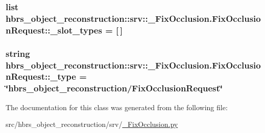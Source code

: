 \hypertarget{classhbrs__object__reconstruction_1_1srv_1_1___fix_occlusion_1_1_fix_occlusion_request_a206df69095ca36bbbbeb723b5e725949}{
\subsubsection[{\-\_\-slot\-\_\-types}]{\setlength{\rightskip}{0pt plus 5cm}list {\bf hbrs\-\_\-object\-\_\-reconstruction\-::srv\-::\-\_\-\-Fix\-Occlusion.\-Fix\-Occlusion\-Request\-::\-\_\-slot\-\_\-types} = \mbox{[}$\,$\mbox{]}}}\label{classhbrs__object__reconstruction_1_1srv_1_1___fix_occlusion_1_1_fix_occlusion_request_a206df69095ca36bbbbeb723b5e725949}
\hypertarget{classhbrs__object__reconstruction_1_1srv_1_1___fix_occlusion_1_1_fix_occlusion_request_a995c44577c086cddd5ba215cfd657496}{
\subsubsection[{\-\_\-type}]{\setlength{\rightskip}{0pt plus 5cm}string {\bf hbrs\-\_\-object\-\_\-reconstruction\-::srv\-::\-\_\-\-Fix\-Occlusion.\-Fix\-Occlusion\-Request\-::\-\_\-type} = \char`\"{}hbrs\-\_\-object\-\_\-reconstruction/{\bf \-Fix\-Occlusion\-Request}\char`\"{}}}\label{classhbrs__object__reconstruction_1_1srv_1_1___fix_occlusion_1_1_fix_occlusion_request_a995c44577c086cddd5ba215cfd657496}


\-The documentation for this class was generated from the following file\-:\begin{DoxyCompactItemize}
\item 
src/hbrs\-\_\-object\-\_\-reconstruction/srv/\hyperlink{___fix_occlusion_8py}{\-\_\-\-Fix\-Occlusion.\-py}\end{DoxyCompactItemize}
